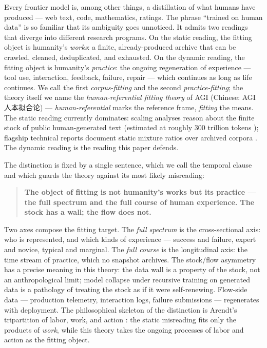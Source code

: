 \documentclass[10pt]{article}
\begin{document}
Every frontier model is, among other things, a distillation of what humans have produced --- web text, code, mathematics, ratings. The phrase ``trained on human data'' is so familiar that its ambiguity goes unnoticed. It admits two readings that diverge into different research programs. On the static reading, the fitting object is humanity's \emph{works}: a finite, already-produced archive that can be crawled, cleaned, deduplicated, and exhausted. On the dynamic reading, the fitting object is humanity's \emph{practice}: the ongoing regeneration of experience --- tool use, interaction, feedback, failure, repair --- which continues as long as life continues. We call the first \emph{corpus-fitting} and the second \emph{practice-fitting}; the theory itself we name the \emph{human-referential fitting theory} of AGI (Chinese: AGI 人本拟合论) --- \emph{human-referential} marks the reference frame, \emph{fitting} the means. The static reading currently dominates: scaling analyses reason about the finite stock of public human-generated text (estimated at roughly 300 trillion tokens \cite{villalobos2022data}); flagship technical reports document static mixture ratios over archived corpora \cite{grattafiori2024llama3}. The dynamic reading is the reading this paper defends.

The distinction is fixed by a single sentence, which we call the temporal clause and which guards the theory against its most likely misreading:

\begin{quote}
\textbf{The object of fitting is not humanity's works but its practice --- the full spectrum and the full course of human experience. The stock has a wall; the flow does not.}
\end{quote}

Two axes compose the fitting target. The \emph{full spectrum} is the cross-sectional axis: who is represented, and which kinds of experience --- success and failure, expert and novice, typical and marginal. The \emph{full course} is the longitudinal axis: the time stream of practice, which no snapshot archives. The stock/flow asymmetry has a precise meaning in this theory: the data wall \cite{villalobos2022data} is a property of the stock, not an anthropological limit; model collapse under recursive training on generated data \cite{shumailov2024collapse} is a pathology of treating the stock as if it were self-renewing. Flow-side data --- production telemetry, interaction logs, failure submissions --- regenerates with deployment. The philosophical skeleton of the distinction is Arendt's tripartition of labor, work, and action \cite{arendt1958human}: the static misreading fits only the products of \emph{work}, while this theory takes the ongoing processes of labor and action as the fitting object.
\end{document}
